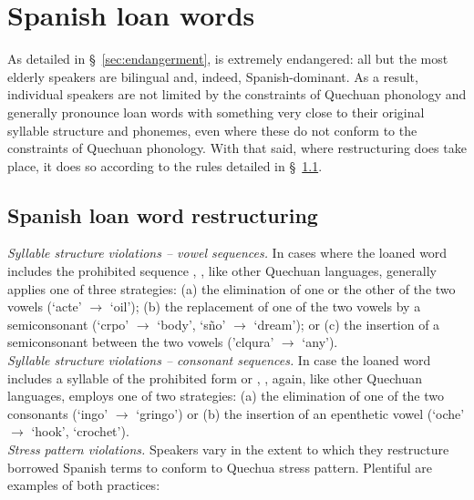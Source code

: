 \section{Spanish loan words}\label{sec:spanish loan}
As detailed in \S~\ref{sec:endangerment}, \SYQ{} is extremely endangered: all but the most elderly speakers are bilingual and, indeed, Spanish-dominant. As a result, individual speakers are not limited by the constraints of Quechuan phonology and generally pronounce loan words with something very close to their original syllable structure and phonemes, even where these do not conform to the constraints of Quechuan phonology. With that said, where restructuring does take place, it does so according to the rules detailed in \S~\ref{ssec:spalw}.

\subsection{Spanish loan word restructuring}\label{ssec:spalw}
\emph{Syllable structure violations -- vowel sequences.} In cases where the loaned word includes the prohibited sequence \textipa{*}\VV, \SYQ{}, like other Quechuan languages, generally applies one of three strategies: (a) the elimination of one or the other of the two vowels (`acte' $\rightarrow$  `oil'); (b) the replacement of one of the two vowels by a semiconsonant (`crpo' $\rightarrow$  `body', `s\~no' $\rightarrow$  `dream'); or (c) the insertion of a semiconsonant between the two vowels ('clqura' $\rightarrow$  `any').\\

\noindent
\emph{Syllable structure violations -- consonant sequences.} In case the loaned word includes a syllable of the prohibited form \textipa{*}\CCV{} or \textipa{*}\VCC, \SYQ{}, again, like other Quechuan languages, employs one of two strategies: (a) the elimination of one of the two consonants (`ingo' $\rightarrow$  `gringo') or (b) the insertion of an epenthetic vowel (`oche' $\rightarrow$  `hook', `crochet').\\

\noindent
\emph{Stress pattern violations.} Speakers vary in the extent to which they restructure borrowed Spanish terms to conform to Quechua stress pattern. Plentiful are examples of both practices:

